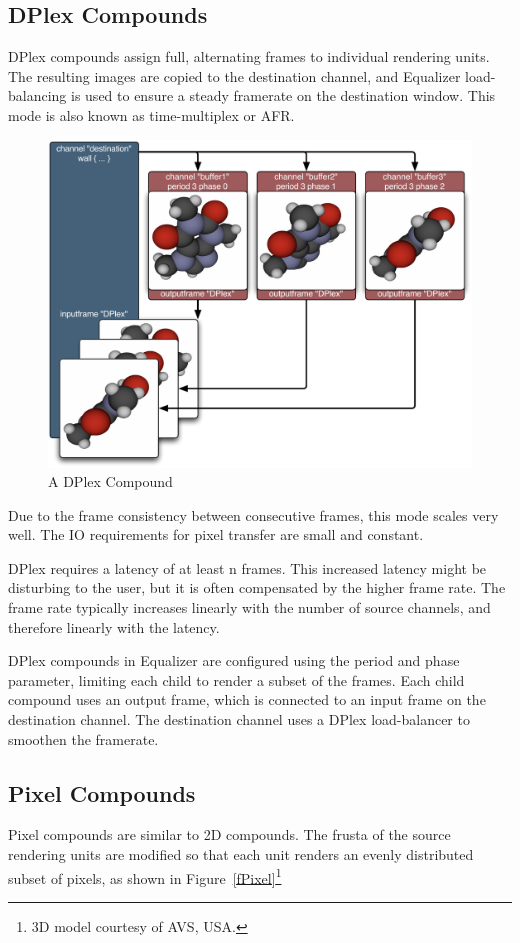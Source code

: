 \documentclass[10pt,a4]{scrartcl}
\newcommand{\fig}[1]{Figure~\ref{#1}}
\begin{document}
\subsection{\label{sDPlex}DPlex Compounds}

DPlex compounds assign full, alternating frames to individual rendering
units. The resulting images are copied to the destination channel, and
Equalizer load-balancing is used to ensure a steady framerate on the
destination window. This mode is also known as time-multiplex or AFR.

\begin{figure}
  \includegraphics[width=.618\textwidth]{images/DPlex.pdf}
  {\caption{ A DPlex Compound}}
\end{figure}

Due to the frame consistency between consecutive frames, this mode scales
very well. The IO requirements for pixel transfer are small and
constant.

DPlex requires a latency of at least n frames. This increased latency
might be disturbing to the user, but it is often compensated by the
higher frame rate. The frame rate typically increases linearly with the
number of source channels, and therefore linearly with the latency.

DPlex compounds in Equalizer are configured using the \textsf{period}
and \textsf{phase} parameter, limiting each child to render a subset of
the frames. Each child compound uses an output frame, which is connected
to an input frame on the destination channel. The destination channel
uses a DPlex load-balancer to smoothen the framerate.


\subsection{Pixel Compounds}

Pixel compounds are similar to 2D compounds. The frusta of the
source rendering units are modified so that each unit renders an evenly
distributed subset of pixels, as shown in \fig{fPixel}\footnote{3D model courtesy of AVS, USA.}
\end{document}
